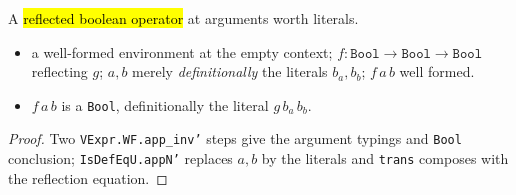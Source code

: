 \begin{theorem}
  \label{prim-bitwise:thm:boolop2-apply}
  \leanok

   A \hl{reflected boolean operator} at arguments worth literals.
  \begin{itemize}
  \item {} a well-formed environment at the empty context; $f : \mathtt{Bool} \to
    \mathtt{Bool} \to \mathtt{Bool}$ reflecting $g$; $a, b$ merely \emph{definitionally} the
    literals $b_a, b_b$; $f\,a\,b$ well formed.
  \item {} $f\,a\,b$ is a \texttt{Bool}, definitionally the literal $g\,b_a\,b_b$.
  \end{itemize}
\end{theorem}
\begin{proof}
  \leanok
   Two \texttt{VExpr.WF.app\_inv'} steps give the argument typings and \texttt{Bool}
  conclusion; \texttt{IsDefEqU.appN'} replaces $a, b$ by the literals and \texttt{trans} composes
  with the reflection equation.
\end{proof}

